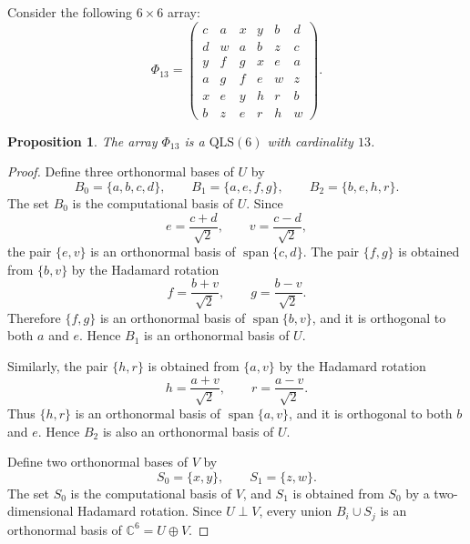 \documentclass[a4paper,11pt]{article}
\newcommand{\C}{\mathbb{C}}
\newcommand{\QLS}{\mathrm{QLS}}
\newtheorem{proposition}{Proposition}
\begin{document}
Consider the following $6\times6$ array:
\[
\Phi_{13}=
\begin{pmatrix}
 c&a&x&y&b&d\\
 d&w&a&b&z&c\\
 y&f&g&x&e&a\\
 a&g&f&e&w&z\\
 x&e&y&h&r&b\\
 b&z&e&r&h&w
\end{pmatrix}.
\]

\begin{proposition}
The array $\Phi_{13}$ is a $\QLS(6)$ with cardinality $13$.
\end{proposition}

\begin{proof}
Define three orthonormal bases of $U$ by
\[
  B_0=\{a,b,c,d\},
  \qquad
  B_1=\{a,e,f,g\},
  \qquad
  B_2=\{b,e,h,r\}.
\]
The set $B_0$ is the computational basis of $U$. Since
\[
  e=\frac{c+d}{\sqrt2},
  \qquad
  v=\frac{c-d}{\sqrt2},
\]
the pair $\{e,v\}$ is an orthonormal basis of $\operatorname{span}\{c,d\}$.
The pair $\{f,g\}$ is obtained from $\{b,v\}$ by the Hadamard rotation
\[
  f=\frac{b+v}{\sqrt2},
  \qquad
  g=\frac{b-v}{\sqrt2}.
\]
Therefore $\{f,g\}$ is an orthonormal basis of $\operatorname{span}\{b,v\}$,
and it is orthogonal to both $a$ and $e$. Hence $B_1$ is an orthonormal basis of
$U$.

Similarly, the pair $\{h,r\}$ is obtained from $\{a,v\}$ by the Hadamard
rotation
\[
  h=\frac{a+v}{\sqrt2},
  \qquad
  r=\frac{a-v}{\sqrt2}.
\]
Thus $\{h,r\}$ is an orthonormal basis of $\operatorname{span}\{a,v\}$, and it
is orthogonal to both $b$ and $e$. Hence $B_2$ is also an orthonormal basis of
$U$.

Define two orthonormal bases of $V$ by
\[
  S_0=\{x,y\},
  \qquad
  S_1=\{z,w\}.
\]
The set $S_0$ is the computational basis of $V$, and $S_1$ is obtained from
$S_0$ by a two-dimensional Hadamard rotation. Since $U\perp V$, every union
$B_i\cup S_j$ is an orthonormal basis of $\C^6=U\oplus V$.


\end{proof}
\end{document}
